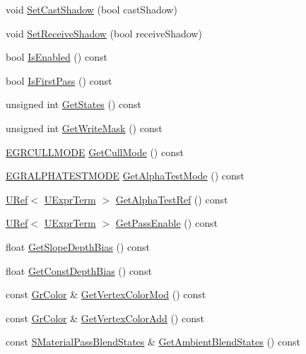 \begin{CompactItemize}
\item 
void \hyperlink{class_gr_material_pass_148e7583791d48dfad8a19bcbadcd8c2}{SetCastShadow} (bool castShadow)
\item 
void \hyperlink{class_gr_material_pass_c4c6bb30dab587d51b255c91f428edaa}{SetReceiveShadow} (bool receiveShadow)
\item 
bool \hyperlink{class_gr_material_pass_ad6cbb60949c8176c9e7248f3208ee75}{IsEnabled} () const 
\item 
bool \hyperlink{class_gr_material_pass_e8a92f3084a45fcd9337e2488719400d}{IsFirstPass} () const 
\item 
unsigned int \hyperlink{class_gr_material_pass_241ea5e30cab7f74997a32b9479180e3}{GetStates} () const 
\item 
unsigned int \hyperlink{class_gr_material_pass_ce9bd1f84b590d9916f84b123d89dbeb}{GetWriteMask} () const 
\item 
\hyperlink{_gr_util_8h_ea790ef067767354691d0d60c51542fe}{EGRCULLMODE} \hyperlink{class_gr_material_pass_365c60391a1ecf5468034f27db810c87}{GetCullMode} () const 
\item 
\hyperlink{_gr_util_8h_abff98128b1f220d1ceff538f4abdef3}{EGRALPHATESTMODE} \hyperlink{class_gr_material_pass_bcc04a3190ab557eebf814382b055dd7}{GetAlphaTestMode} () const 
\item 
\hyperlink{class_u_ref}{URef}$<$ \hyperlink{class_u_expr_term}{UExprTerm} $>$ \hyperlink{class_gr_material_pass_a4a289c7731127effe76a46eaf255fc6}{GetAlphaTestRef} () const 
\item 
\hyperlink{class_u_ref}{URef}$<$ \hyperlink{class_u_expr_term}{UExprTerm} $>$ \hyperlink{class_gr_material_pass_a23b06c046521ef6912665969576500c}{GetPassEnable} () const 
\item 
float \hyperlink{class_gr_material_pass_5d7fb2c310bd6996474166d2b04f6e61}{GetSlopeDepthBias} () const 
\item 
float \hyperlink{class_gr_material_pass_f36302b1ba423ef54654847d5e881c4b}{GetConstDepthBias} () const 
\item 
const \hyperlink{class_gr_color}{GrColor} \& \hyperlink{class_gr_material_pass_d806a37ef0afb86d3e5856f4cefa89d9}{GetVertexColorMod} () const 
\item 
const \hyperlink{class_gr_color}{GrColor} \& \hyperlink{class_gr_material_pass_9bf48a9c92c48fe9edea9ee9c5f23550}{GetVertexColorAdd} () const 
\item 
const \hyperlink{struct_s_material_pass_blend_states}{SMaterialPassBlendStates} \& \hyperlink{class_gr_material_pass_931b56341af762712eec766d2be3caab}{GetAmbientBlendStates} () const 

\end{CompactItemize}
